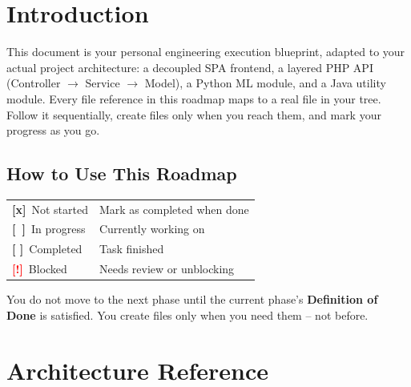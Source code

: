 \documentclass[11pt,a4paper]{report}
\newcommand{\todo}{\textcolor{helixamber}{\textbf{[ ]}}}
\newcommand{\done}{\textcolor{helixteal}{\textbf{[x]}}}
\newcommand{\inprogress}{\textcolor{helixpurplemid}{\textbf{[~]}}}
\newcommand{\blocked}{\textcolor{red}{\textbf{[!]}}}
\begin{document}
{
    \hypersetup{linkcolor=black}
    \tableofcontents
    \thispagestyle{empty}
}
\clearpage

\chapter*{Introduction}

This document is your personal engineering execution blueprint, adapted to your actual project architecture: a decoupled SPA frontend, a layered PHP API (Controller $\rightarrow$ Service $\rightarrow$ Model), a Python ML module, and a Java utility module. Every file reference in this roadmap maps to a real file in your tree. Follow it sequentially, create files only when you reach them, and mark your progress as you go.

\section*{How to Use This Roadmap}

\begin{center}
\begin{tabular}{C{2cm} L{12cm}}
    \toprule
    \done\ Not started & Mark as completed when done \\
    \inprogress\ In progress & Currently working on \\
    \todo\ Completed & Task finished \\
    \blocked\ Blocked & Needs review or unblocking \\
    \bottomrule
\end{tabular}
\end{center}

\begin{infobox}[title=Core Principle]
You do not move to the next phase until the current phase's \textbf{Definition of Done} is satisfied. You create files only when you need them -- not before.
\end{infobox}

\chapter*{Architecture Reference}
\end{document}
